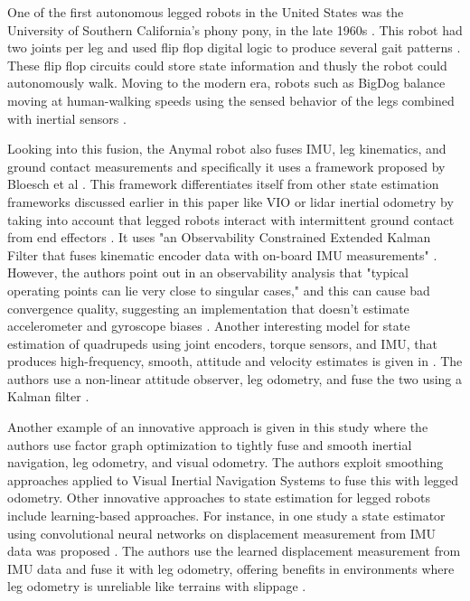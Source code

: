 \documentclass[conference]{IEEEtran}
\begin{document}
One of the first autonomous legged robots in the United States was the University of Southern California's phony pony, in the late 1960s \cite{b9}. This robot had two joints per leg and used flip flop digital logic to produce several gait patterns \cite{b9}. These flip flop circuits could store state information and thusly the robot could autonomously walk. Moving to the modern era, robots such as BigDog balance moving at human-walking speeds using the sensed behavior of the legs combined with inertial sensors \cite{b10}.

Looking into this fusion, the Anymal robot also fuses IMU, leg kinematics, and ground contact measurements and specifically it uses a framework proposed by Bloesch et al \cite{b11}. This framework differentiates itself from other state estimation frameworks discussed earlier in this paper like VIO or lidar inertial odometry by taking into account that legged robots interact with intermittent ground contact from end effectors \cite{b12}. It uses "an Observability Constrained Extended Kalman Filter that fuses kinematic encoder data with on-board IMU measurements" \cite{b12}.  However, the authors point out in an observability analysis that "typical operating points can lie very close to singular cases," and this can cause bad convergence quality, suggesting an implementation that doesn't estimate accelerometer and gyroscope biases \cite{b12}. Another interesting model for state estimation of quadrupeds using joint encoders, torque sensors, and IMU, that produces high-frequency, smooth, attitude and velocity estimates is given in \cite{b13}. The authors use a non-linear attitude observer, leg odometry, and fuse the two using a Kalman filter \cite{b13}. 

 Another example of an innovative approach is given in this study \cite{b15} where the authors use factor graph optimization to tightly fuse and smooth inertial navigation, leg odometry, and visual odometry. The authors exploit smoothing approaches applied to Visual Inertial Navigation Systems to fuse this with legged odometry\cite{b15}. Other innovative approaches to state estimation for legged robots include learning-based approaches. For instance, in one study a state estimator using convolutional neural networks on displacement measurement from IMU data was proposed \cite{b14}. The authors use the learned displacement measurement from IMU data and fuse it with leg odometry, offering 	benefits in environments where leg odometry is unreliable like terrains with slippage \cite{b14}.
\end{document}
